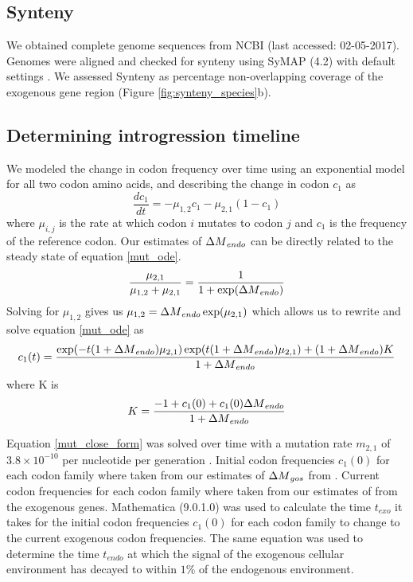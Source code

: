 \documentclass[12pt]{article}
\begin{document}
\subsection*{Synteny}
We obtained complete genome sequences from NCBI (last accessed: 02-05-2017).
Genomes were aligned and checked for synteny using SyMAP (4.2) with default settings \citep{soderlund2006, soderlund2011}.
We assessed Synteny as percentage non-overlapping coverage of the exogenous gene region (Figure \ref{fig:synteny_species}b).

\subsection*{Determining introgression timeline}
We modeled the change in codon frequency over time using an exponential model for all two codon amino acids, and describing the change in codon $c_1$ as
\begin{equation}
\frac{d c_1}{d t} = -\mu_{1,2}c_1 - \mu_{2,1}(1-c_1)
\label{mut_ode}
\end{equation}
where $\mu_{i,j}$ is the rate at which codon $i$ mutates to codon $j$ and $c_1$ is the frequency of the reference codon.
Our estimates of ${\Delta M}_{endo}$ can be directly related to the steady state of equation \ref{mut_ode}.
\begin{equation}
\frac{\mu_{2,1}}{\mu_{1,2} + \mu_{2,1}} = \frac{1}{1+\exp({\Delta M}_{endo})}
\end{equation}
Solving for $\mu_{1,2}$ gives us $\mu_{1,2} = {\Delta M}_{endo}\exp(\mu_{2,1})$ which allows us to rewrite and solve equation \ref{mut_ode} as
\begin{equation}
c_1(t) = \frac{\exp(-t(1+{\Delta M}_{endo})\mu_{2,1})\exp(t(1+{\Delta M}_{endo})\mu_{2,1}) + (1+{\Delta M}_{endo})K}{1+{\Delta M}_{endo}}
\label{mut_close_form}
\end{equation}
where K is
\begin{equation}
K = \frac{-1 + c_1(0) + c_1(0){\Delta M}_{endo}}{1+{\Delta M}_{endo}}
\end{equation}

Equation \ref{mut_close_form} was solved over time with a mutation rate $m_{2,1}$ of $3.8\times 10^{-10}$ per nucleotide per generation \citep{lang2008}. 
Initial codon frequencies $c_1(0)$ for each codon family where taken from our estimates of ${\Delta M}_{gos}$ from \gossypii. 
Current codon frequencies for each codon family where taken from our estimates of \DM from the exogenous genes.
Mathematica (9.0.1.0) \citep{Mathematica} was used to calculate the time $t_{exo}$ it takes for the initial codon frequencies $c_1(0)$ for each codon family to change to the current exogenous codon frequencies.
The same equation was used to determine the time $t_{endo}$ at which the signal of the exogenous cellular environment has decayed to within $1 \%$ of the endogenous environment.
\end{document}
